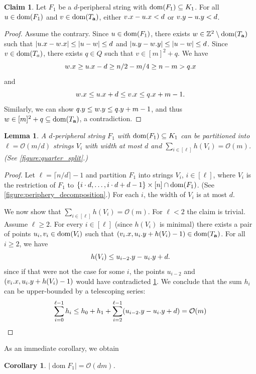 \documentclass[11pt, letterpaper]{article}
\theoremstyle{plain}
\newtheorem{lemma}{Lemma}
\newtheorem{corollary}[fact]{Corollary}
\theoremstyle{definition}
\newtheorem{claim}{Claim}
\theoremstyle{remark}
\newcommand{\Z}{\mathbb{Z}}
\renewcommand{\O}{\mathcal{O}}
\newcommand{\set}[1]{\left\lbrace #1 \right\rbrace}
\DeclareMathOperator*{\dom}{dom}
\begin{document}
\begin{claim}\label{border_lemma}
Let $F_1$ be a $d$-peripheral string with $\d{F_1} \subseteq K_1$. For all $u \in \d{F_1}$ and $v \in \d{\Ta}$, either $v.x - u.x < d$ or $v.y - u.y < d$.  
\end{claim}
\begin{proof}
Assume the contrary. Since $u \in \d{F_1}$, there exists $w \in \Z^2 \setminus \d{\Ta}$ such that $|u.x - w.x| \le |u-w| \le d$ and $|u.y - w.y| \le |u-w| \le d$. Since $v \in \d{T_a}$, there exists $q \in Q$ such that $v \in [m]^2 + q$. We have
\[ w.x \ge u.x - d \ge n/2 - m/4 \ge n - m > q.x\]
and
\[ w.x \le u.x + d \le v.x \le q.x + m - 1. \]
Similarly, we can show $q.y \le w.y \le q.y + m - 1$, and thus $w \in [m]^2 + q \subseteq \d{\Ta}$, a contradiction.
\end{proof}

\begin{lemma}\label{lm:partitioning}
A $d$-peripheral string $F_1$ with $\d{F_1} \subseteq K_1$ can be partitioned into $\ell = \O(m/d)$ strings $V_i$ with width at most $d$ and $\sum_{i \in [\ell]} h(V_i) = \O(m)$. (See \cref{figure:quarter_split}.)
\end{lemma}
\begin{proof}
Let $\ell = \lceil n / d \rceil - 1$ and partition $F_1$ into strings $V_i$, $i \in [\ell]$, where $V_i$ is the restriction of $F_1$ to $\set{i \cdot d, \dots, i \cdot d + d - 1} \times [n] \cap \d{F_1}$. (See \cref{figure:periphery_decomposition}.) 
For each $i$, the width of $V_i$ is at most $d$. 

We now show that $\sum_{i \in [\ell]} h(V_i) = \O(m)$. For $\ell < 2$ the claim is trivial. Assume $\ell \ge 2$. For every $i \in [\ell]$ (since $h(V_i)$ is minimal) there exists a pair of points $u_i, v_i \in \d{V_i}$ such that $(\x{v_i}, \y{u_i} + h(V_i) - 1) \in \d{\Ta}$. For all $i \ge 2$, we have
\[ h(V_i) \le u_{i - 2}.y - u_{i}.y + d.\]
since if that were not the case for some $i$, the points $u_{i - 2}$ and $(v_{i}.x, u_{i}.y + h(V_i) - 1)$ would have contradicted \cref{border_lemma}. We conclude that the sum $h_i$ can be upper-bounded by a telescoping series:
%
$$\sum_{i = 0}^{\ell - 1} h_i \le h_0 + h_1 + \sum_{i = 2}^{\ell - 1} (\y{u_{i - 2}} - \y{u_i} + d) = \O(m)$$
\end{proof}

As an immediate corollary, we obtain

\begin{corollary}\label{cor:area_F}
$|\dom{F_1}| = \O(dm)$. 
\end{corollary}
\end{document}
